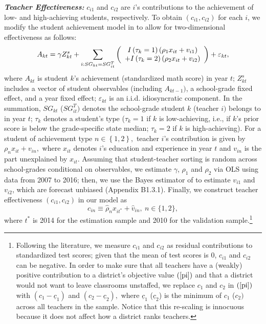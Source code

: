 \documentclass[notitlepage,12pt]{article}%
\begin{document}
\medskip\noindent\textit{\textbf{Teacher Effectiveness: }}$c_{i1}$ and
$c_{i2}$ are $i$'s contributions to the achievement of low- and high-achieving
students, respectively.\textit{\textbf{ }}To obtain $\left(  c_{i1}%
,c_{i2}\right)  $ for each $i$, we modify the student achievement model in
\citet{kane2008estimating} to allow for two-dimensional effectiveness as
follows:
\begin{equation}
A_{kt}=\gamma Z_{kt}^{s}+\sum_{i:SG_{kt}=SG_{it}^{T}}\left(
\begin{array}
[c]{c}%
I\left(  \tau_{k}=1\right)  (\rho_{1}x_{it}+v_{i1})\\
+I\left(  \tau_{k}=2\right)  (\rho_{2}x_{it}+v_{i2})
\end{array}
\right)  +\varepsilon_{kt}, \label{achievement}%
\end{equation}
where $A_{kt}$ is student $k$'s achievement (standardized math score) in year
$t$; $Z_{kt}^{s}$ includes a vector of student observables (including
$A_{kt-1})$, a school-grade fixed effect, and a year fixed effect;
$\varepsilon_{kt}$ is an i.i.d. idiosyncratic component. In the summation,
$SG_{kt}$ ($SG_{it}^{T})$ denotes the school-grade student $k$ (teacher $i)$
belongs to in year $t$; $\tau_{k}$ denotes a student's type ($\tau_{k}=1$ if
$k$ is low-achieving, i.e., if $k$'s prior score is below the grade-specific
state median; $\tau_{k}=2$ if $k$ is high-achieving). For a student of
achievement type $n\in\left\{  1,2\right\}  ,$ teacher $i$'s contribution is
given by $\rho_{n}x_{it}+v_{in},$ where $x_{it}$ denotes $i$'s education and
experience in year $t$ and $v_{in}$ is the part unexplained by $x_{it}.$
Assuming that student-teacher sorting is random across school-grades
conditional on observables, we estimate $\gamma$, $\rho_{1}$ and $\rho_{2}$
via OLS using data from 2007 to 2016; then, we use the Bayes estimator of
\citet{kane2008estimating} to estimate $v_{i1}$ and $v_{i2}$, which are forecast unbiased (Appendix
B1.3.1). Finally, we construct teacher effectiveness $\left(  c_{i1}%
,c_{i2}\right)  $ in our model as
\begin{equation}
c_{in}\equiv\widehat{\rho}_{n}x_{it^{\ast}}+\widehat{v}_{in},\ n\in\{1,2\},
\label{cc}%
\end{equation}
where $t^{\ast}$ is 2014 for the estimation sample and 2010 for the validation
sample.\footnote{Following the literature, we measure $c_{i1}$ and $c_{i2}$ as
residual contributions to standardized test scores; given that the mean of
test scores is 0, $c_{i1}$ and $c_{i2}$ can be negative. In order to make sure
that all teachers have a (weakly) positive contribution to a district's
objective value $\left(  \ref{pi}\right)  $ and that a district would not want
to leave classrooms unstaffed, we replace $c_{1}$ and $c_{2}$ in $\left(
\ref{pi}\right)  $ with $\left(  c_{1}-\underline{c}_{1}\right)  $ and
$\left(  c_{2}-\underline{c}_{2}\right)  ,$ where $\underline{c}_{1}$
($\underline{c}_{2}$) is the minimum of $c_{1}$ ($c_{2})$ across all teachers
in the sample. Notice that this re-scaling is innocuous because it does not
affect how a district ranks teachers.}
\end{document}
